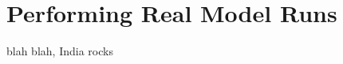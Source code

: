 \documentclass[main.tex]{subfiles}
\begin{document}
\setcounter{section}{3}
\section{Performing Real Model Runs}

blah blah, India rocks
\end{document}
